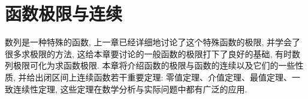 
\chapter{函数极限与连续}\label{ch:2}

数列是一种特殊的函数, 上一章已经详细地讨论了这个特殊函数的极限, 并学会了很多求极限的方法, 这给本章要讨论的一般函数的极限打下了良好的基础, 有时数列极限可化为求函数极限. 本章将介绍函数的极限与函数的连续以及它们的一些性质, 并给出闭区间上连续函数若干重要定理: 零值定理、介值定理、最值定理、一致连续性定理, 这些定理在数学分析与实际问题中都有广泛的应用.







